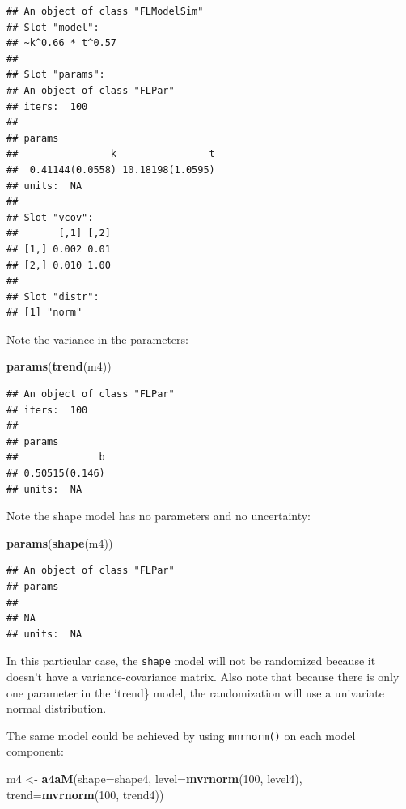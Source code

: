 \documentclass[
]{book}
\newenvironment{Shaded}{\begin{snugshade}}{\end{snugshade}}
\newcommand{\AttributeTok}[1]{\textcolor[rgb]{0.13,0.29,0.53}{#1}}
\newcommand{\DecValTok}[1]{\textcolor[rgb]{0.00,0.00,0.81}{#1}}
\newcommand{\FunctionTok}[1]{\textcolor[rgb]{0.13,0.29,0.53}{\textbf{#1}}}
\newcommand{\NormalTok}[1]{#1}
\newcommand{\OtherTok}[1]{\textcolor[rgb]{0.56,0.35,0.01}{#1}}
\begin{document}
\begin{verbatim}
## An object of class "FLModelSim"
## Slot "model":
## ~k^0.66 * t^0.57
## 
## Slot "params":
## An object of class "FLPar"
## iters:  100 
## 
## params
##                k                t 
##  0.41144(0.0558) 10.18198(1.0595) 
## units:  NA 
## 
## Slot "vcov":
##       [,1] [,2]
## [1,] 0.002 0.01
## [2,] 0.010 1.00
## 
## Slot "distr":
## [1] "norm"
\end{verbatim}

Note the variance in the parameters:

\begin{Shaded}
\begin{Highlighting}[]
\FunctionTok{params}\NormalTok{(}\FunctionTok{trend}\NormalTok{(m4))}
\end{Highlighting}
\end{Shaded}

\begin{verbatim}
## An object of class "FLPar"
## iters:  100 
## 
## params
##              b 
## 0.50515(0.146) 
## units:  NA
\end{verbatim}

Note the shape model has no parameters and no uncertainty:

\begin{Shaded}
\begin{Highlighting}[]
\FunctionTok{params}\NormalTok{(}\FunctionTok{shape}\NormalTok{(m4))}
\end{Highlighting}
\end{Shaded}

\begin{verbatim}
## An object of class "FLPar"
## params
##    
## NA 
## units:  NA
\end{verbatim}

In this particular case, the \texttt{shape} model will not be randomized because it doesn't have a variance-covariance matrix. Also note that because there is only one parameter in the `trend\} model, the randomization will use a univariate normal distribution.

The same model could be achieved by using \texttt{mnrnorm()} on each model component:

\begin{Shaded}
\begin{Highlighting}[]
\NormalTok{m4 }\OtherTok{\textless{}{-}} \FunctionTok{a4aM}\NormalTok{(}\AttributeTok{shape=}\NormalTok{shape4, }\AttributeTok{level=}\FunctionTok{mvrnorm}\NormalTok{(}\DecValTok{100}\NormalTok{, level4), }\AttributeTok{trend=}\FunctionTok{mvrnorm}\NormalTok{(}\DecValTok{100}\NormalTok{, trend4))}
\end{Highlighting}
\end{Shaded}
\end{document}
